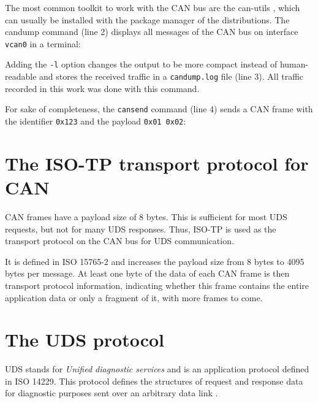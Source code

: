 
The most common toolkit to work with the CAN bus are the can-utils \cite{can-utils}, which can usually be installed with the package manager of the distributions. The candump command (line 2) displays all messages of the CAN bus on interface \texttt{vcan0} in a terminal:

Adding the \texttt{-l} option changes the output to be more compact instead of human-readable and stores the received traffic in a \texttt{candump.log} file (line 3). All traffic recorded in this work was done with this command.

For sake of completeness, the \texttt{cansend} command (line 4) sends a CAN frame with the identifier \texttt{0x123} and the payload \texttt{0x01 0x02}:

\section{The ISO-TP transport protocol for CAN}

CAN frames have a payload size of 8 bytes. This is sufficient for most UDS requests, but not for many UDS responses. Thus, ISO-TP is used as the transport protocol on the CAN bus for UDS communication.

It is defined in ISO 15765-2 and increases the payload size from 8 bytes to 4095 bytes per message. At least one byte of the data of each CAN frame is then transport protocol information, indicating whether this frame contains the entire application data or only a fragment of it, with more frames to come.

\section{The UDS protocol}

UDS stands for \emph{Unified diagnostic services} and is an application protocol defined in ISO 14229. This protocol defines the structures of request and response data for diagnostic purposes sent over an arbitrary data link \cite{iso14229}.

